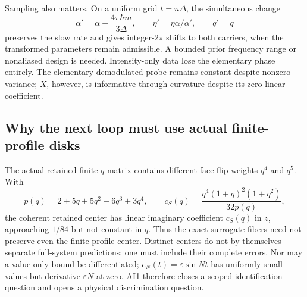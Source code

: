 \documentclass[11pt,a4paper]{article}
\begin{document}
Sampling also matters. On a uniform grid $t=n\Delta$, the simultaneous change
\begin{equation}
\alpha'=\alpha+\frac{4\pi\hbar m}{3\Delta},\qquad
\eta'=\eta\alpha/\alpha',\qquad q'=q
\label{eq:alias}
\end{equation}
preserves the slow rate and gives integer-$2\pi$ shifts to both carriers, when the transformed parameters remain admissible. A bounded prior frequency range or nonaliased design is needed. Intensity-only data lose the elementary phase entirely. The elementary demodulated probe remains constant despite nonzero variance; $X$, however, is informative through curvature despite its zero linear coefficient.

\subsection{Why the next loop must use actual finite-profile disks}
The actual retained finite-$q$ matrix contains different face-flip weights $q^4$ and $q^5$. With
\begin{equation}
p(q)=2+5q+5q^2+6q^3+3q^4,\qquad
c_S(q)=\frac{q^4(1+q)^2(1+q^2)}{32p(q)},
\label{eq:slope}
\end{equation}
the coherent retained center has linear imaginary coefficient $c_S(q)$ in $z$, approaching $1/84$ but not constant in $q$. Thus the exact surrogate fibers need not preserve even the finite-profile center. Distinct centers do not by themselves separate full-system predictions: one must include their complete errors. Nor may a value-only bound be differentiated; $e_N(t)=\varepsilon\sin Nt$ has uniformly small values but derivative $\varepsilon N$ at zero. AI1 therefore closes a scoped identification question and opens a physical discrimination question.



\clearpage
\appendix


\end{document}
